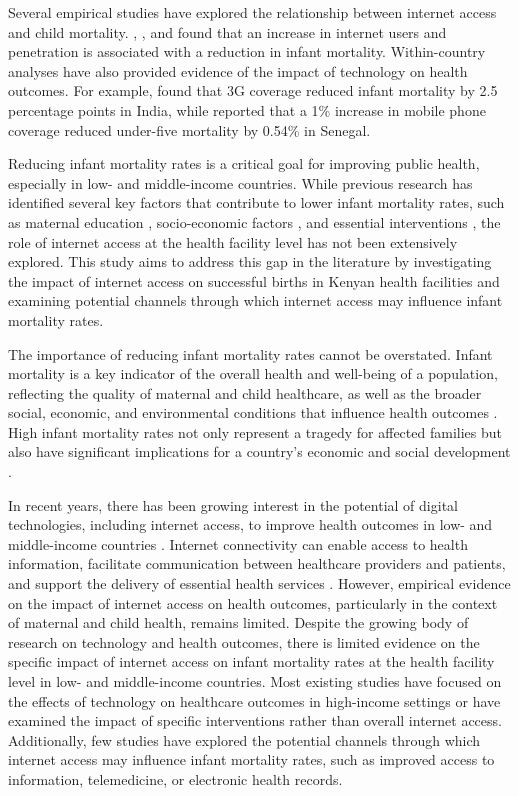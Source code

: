 \documentclass[12pt]{article}
\begin{document}
Several empirical studies have explored the relationship between internet access and child mortality. \citet{Lio2011}, \citet{Shehata2016}, and \citet{ChenLei2018} found that an increase in internet users and penetration is associated with a reduction in infant mortality. Within-country analyses have also provided evidence of the impact of technology on health outcomes. For example, \citet{Menon2016} found that 3G coverage reduced infant mortality by 2.5 percentage points in India, while \citet{HasbiDubus2020} reported that a 1\% increase in mobile phone coverage reduced under-five mortality by 0.54\% in Senegal.

Reducing infant mortality rates is a critical goal for improving public health, especially in low- and middle-income countries. While previous research has identified several key factors that contribute to lower infant mortality rates, such as maternal education \citep{Caldwell1979, Cleland1988}, socio-economic factors \citep{Mosley1984, Hobcraft1984}, and essential interventions \citep{Lassi2014, Akseer2015}, the role of internet access at the health facility level has not been extensively explored. This study aims to address this gap in the literature by investigating the impact of internet access on successful births in Kenyan health facilities and examining potential channels through which internet access may influence infant mortality rates.

The importance of reducing infant mortality rates cannot be overstated. Infant mortality is a key indicator of the overall health and well-being of a population, reflecting the quality of maternal and child healthcare, as well as the broader social, economic, and environmental conditions that influence health outcomes \citep{Reidpath2003}. High infant mortality rates not only represent a tragedy for affected families but also have significant implications for a country's economic and social development \citep{Bloom2004}.

In recent years, there has been growing interest in the potential of digital technologies, including internet access, to improve health outcomes in low- and middle-income countries \citep{Mehl2018}. Internet connectivity can enable access to health information, facilitate communication between healthcare providers and patients, and support the delivery of essential health services \citep{Piette2012}. However, empirical evidence on the impact of internet access on health outcomes, particularly in the context of maternal and child health, remains limited.
Despite the growing body of research on technology and health outcomes, there is limited evidence on the specific impact of internet access on infant mortality rates at the health facility level in low- and middle-income countries. Most existing studies have focused on the effects of technology on healthcare outcomes in high-income settings or have examined the impact of specific interventions rather than overall internet access. Additionally, few studies have explored the potential channels through which internet access may influence infant mortality rates, such as improved access to information, telemedicine, or electronic health records.
\end{document}

